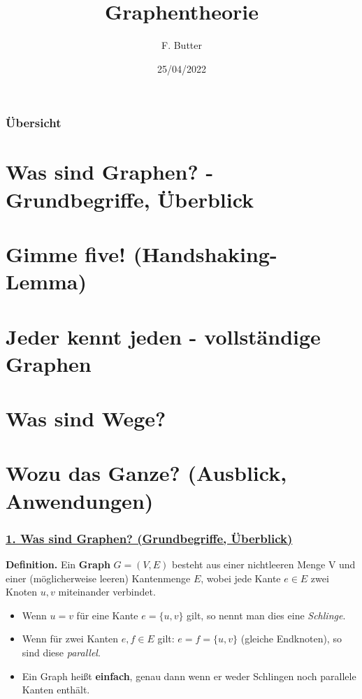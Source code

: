 \documentclass{beamer}
\title{Graphentheorie} %
\author{F. Butter }
\date{25/04/2022}
\institute{Technische Universität Dresden}
\begin{document}
\maketitle

\begin{frame}
    \frametitle{Übersicht}
    \tableofcontents
        \section{Was sind Graphen? - Grundbegriffe, Überblick}
        \label{sec:one}
        \section{Gimme five! (Handshaking-Lemma)}
        \label{sec:two}
        \section{Jeder kennt jeden - vollständige Graphen}
        \label{sec:three}
        \section{Was sind Wege?}
        \label{sec:four}
        \section{Wozu das Ganze? (Ausblick, Anwendungen)}
        \label{sec:five}
\end{frame}

\begin{frame}
    \frametitle{\hyperref[sec:one]{1. Was sind Graphen? (Grundbegriffe, Überblick)}}
        \textbf{Definition.} 
            Ein \textbf{Graph} \( G = (V, E)\) besteht aus einer nichtleeren Menge V und einer (möglicherweise leeren) Kantenmenge \(E\), wobei jede Kante \(e \in E\) zwei Knoten \(u, v\) miteinander verbindet.\\
    \bigskip
\end{frame}

\begin{frame}
    \begin{itemize}
        \item Wenn \(u = v\) für eine Kante \(e = \{u, v\}\) gilt, so nennt man dies eine \textit{Schlinge}. 
        \item Wenn für zwei Kanten \(e, f \in E\) gilt: \(e = f = \{u , v\}\) (gleiche Endknoten), so sind diese \textit{parallel}. 
        \item Ein Graph heißt \textbf{einfach}, genau dann wenn er weder Schlingen noch parallele Kanten enthält.
    \end{itemize}
\end{frame}
\end{document}
